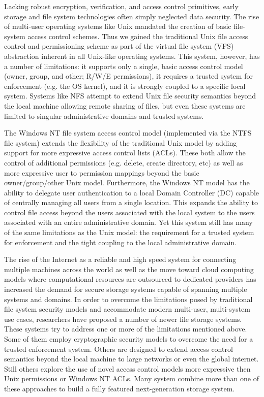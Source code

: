 Lacking robust encryption, verification, and access control
primitives, early storage and file system technologies often simply
neglected data security. The rise of multi-user operating systems like
Unix mandated the creation of basic file-system access control
schemes. Thus we gained the traditional Unix file access control and
permissioning scheme as part of the virtual file system
(VFS)~\cite{linux-vfs} abstraction inherent in all Unix-like operating
systems. This system, however, has a number of limitations: it
supports only a single, basic access control model (owner, group, and
other; R/W/E permissions), it requires a trusted system for
enforcement (e.g. the OS kernel), and it is strongly coupled to a
specific local system. Systems like NFS attempt to extend Unix file
security semantics beyond the local machine allowing remote sharing of
files, but even these systems are limited to singular administrative
domains and trusted systems.

The Windows NT file system access control model (implemented via the
NTFS file system) extends the flexibility of the traditional Unix
model by adding support for more expressive access control lists
(ACLs). These both allow the control of additional permissions
(e.g. delete, create directory, etc) as well as more expressive user
to permission mappings beyond the basic owner/group/other Unix
model. Furthermore, the Windows NT model has the ability to delegate
user authentication to a local Domain Controller (DC) capable of
centrally managing all users from a single location. This expands the
ability to control file access beyond the users associated with the
local system to the users associated with an entire administrative
domain. Yet this system still has many of the same limitations as the
Unix model: the requirement for a trusted system for enforcement and
the tight coupling to the local administrative domain.

The rise of the Internet as a reliable and high speed system for
connecting multiple machines across the world as well as the move
toward cloud computing models where computational resources are
outsourced to dedicated providers has increased the demand for secure
storage systems capable of spanning multiple systems and domains. In
order to overcome the limitations posed by traditional file system
security models and accommodate modern multi-user, multi-system use
cases, researchers have proposed a number of newer file storage
systems. These systems try to address one or more of the limitations
mentioned above. Some of them employ cryptographic security models to
overcome the need for a trusted enforcement system. Others are
designed to extend access control semantics beyond the local machine
to large networks or even the global internet. Still others explore
the use of novel access control models more expressive then Unix
permissions or Windows NT ACLs. Many system combine more than one of
these approaches to build a fully featured next-generation storage
system.

